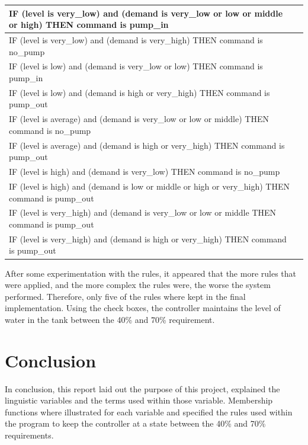  \begin{longtable}{|l|>{\raggedleft\arraybackslash}p{4cm}|l|l|l}
	\hline 
 	\multicolumn{4}{|l|}{IF (level is very\_low) and (demand is very\_low or low or middle or high) THEN command is pump\_in} \\ 
 	\hline 
 	\multicolumn{4}{|l|}{IF (level is very\_low) and (demand is very\_high) THEN command is no\_pump} \\ 
 	\hline 
 	\multicolumn{4}{|l|}{IF (level is low) and (demand is very\_low or low) THEN command is pump\_in} \\ 
 	\hline 
 	\multicolumn{4}{|l|}{IF (level is low) and (demand is high or very\_high) THEN command is pump\_out} \\ 
 	\hline 
 	\multicolumn{4}{|l|}{IF (level is average) and (demand is very\_low or low or middle) THEN command is no\_pump} \\ 
 	\hline 
 	\multicolumn{4}{|l|}{IF (level is average) and (demand is high or very\_high) THEN command is pump\_out} \\ 
 	\hline 
 	\multicolumn{4}{|l|}{IF (level is high) and (demand is very\_low) THEN command is no\_pump} \\ 
 	\hline 
 	\multicolumn{4}{|l|}{IF (level is high) and (demand is low or middle or high or very\_high) THEN command is pump\_out} \\ 
 	\hline 
 	\multicolumn{4}{|l|}{IF (level is very\_high) and (demand is very\_low or low or middle THEN command is pump\_out} \\ 
 	\hline
 	\multicolumn{4}{|l|}{IF (level is very\_high) and (demand is high or very\_high) THEN command is pump\_out} \\ 
 	\hline 
 \end{longtable}

After some experimentation with the rules, it appeared that the more rules that were applied, and the more complex the rules were, the worse the system performed. Therefore, only five of the rules where kept in the final implementation. Using the check boxes, the controller maintains the level of water in the tank between the 40\% and 70\% requirement.



\section*{Conclusion}
In conclusion, this report laid out the purpose of this project, explained the linguistic variables and the terms used within those variable. Membership functions where illustrated for each variable and specified the rules used within the program to keep the controller at a state between the 40\% and 70\% requirements.  
